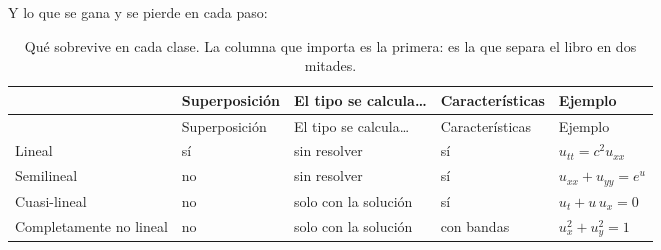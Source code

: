 \documentclass[
  spanish,
  a4paper,
]{scrbook}
\theoremstyle{definition}
\theoremstyle{plain}
\theoremstyle{definition}
\theoremstyle{plain}
\theoremstyle{definition}
\theoremstyle{remark}
\begin{document}
Y lo que se gana y se pierde en cada paso:

\begin{longtable}[]{@{}
  >{\raggedright\arraybackslash}p{}
  >{\centering\arraybackslash}p{}
  >{\raggedright\arraybackslash}p{}
  >{\centering\arraybackslash}p{}
  >{\raggedright\arraybackslash}p{}@{}}
\caption{Qué sobrevive en cada clase. La columna que importa es la
primera: es la que separa el libro en dos
mitades.}\label{tbl-linealidad}\tabularnewline
\toprule\noalign{}
\begin{minipage}[b]{\linewidth}\raggedright
\end{minipage} & \begin{minipage}[b]{\linewidth}\centering
Superposición
\end{minipage} & \begin{minipage}[b]{\linewidth}\raggedright
El tipo se calcula\ldots{}
\end{minipage} & \begin{minipage}[b]{\linewidth}\centering
Características
\end{minipage} & \begin{minipage}[b]{\linewidth}\raggedright
Ejemplo
\end{minipage} \\
\midrule\noalign{}
\endfirsthead
\toprule\noalign{}
\begin{minipage}[b]{\linewidth}\raggedright
\end{minipage} & \begin{minipage}[b]{\linewidth}\centering
Superposición
\end{minipage} & \begin{minipage}[b]{\linewidth}\raggedright
El tipo se calcula\ldots{}
\end{minipage} & \begin{minipage}[b]{\linewidth}\centering
Características
\end{minipage} & \begin{minipage}[b]{\linewidth}\raggedright
Ejemplo
\end{minipage} \\
\midrule\noalign{}
\endhead
\bottomrule\noalign{}
\endlastfoot
Lineal & sí & sin resolver & sí & \(u_{tt}=c^2u_{xx}\) \\
Semilineal & no & sin resolver & sí & \(u_{xx}+u_{yy}=e^u\) \\
Cuasi-lineal & no & solo con la solución & sí & \(u_t+u\,u_x=0\) \\
Completamente no lineal & no & solo con la solución & con bandas &
\(u_x^2+u_y^2=1\) \\
\end{longtable}
\end{document}
